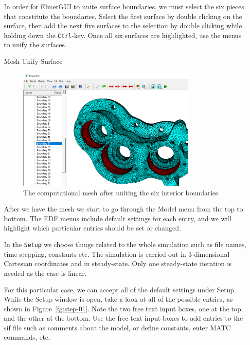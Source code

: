 In order for ElmerGUI to unite surface boundaries, we must select the six pieces that constitute the boundaries.  Select the first surface by double clicking on the surface, then add the next five surfaces to the selection by double clicking while holding down the \texttt{Ctrl}-key.  Once all six surfaces are highlighted, use the menus to unify the surfaces.

\ttbegin
Mesh 
  Unify Surface
\ttend

\begin{figure}[H]
\begin{center}
\includegraphics[width=0.8\textwidth]{bcs_chosen}
\caption{The computational mesh after uniting the six interior boundaries}\label{fg:bcs_chosen}
\end{center}
\end{figure}

After we have the mesh we start to go through the Model menu from the top to bottom.  The EDF menus include default settings for each entry, and we will highlight which particular entries should be set or changed.

In the \texttt{Setup} we choose things related to the whole simulation such as file names, time stepping, constants etc.  The simulation is carried out in 3-dimensional Cartesian coordinates and in steady-state.  Only one steady-state iteration is needed as the case is linear.

For this particular case, we can accept all of the default settings under Setup.  While the Setup window is open, take a look at all of the possible entries, as shown in Figure~\ref{fg:step-01}.  Note the two free text input boxes, one at the top and the other at the bottom.  Use the free text input boxes to add entries to the sif file such as comments about the model, or define constants, enter MATC commands, etc.

